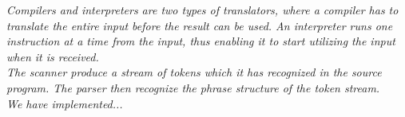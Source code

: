 \vspace{30pt}

\textit{Compilers and interpreters are two types of translators, where a compiler has to translate the entire input before the result can be used. An interpreter runs one instruction at a time from the input, thus enabling it to start utilizing the input when it is received.\\ \indent
The scanner produce a stream of tokens which it has recognized in the source program. The parser then recognize the phrase structure of the token stream.\\ \indent
We have implemented...}